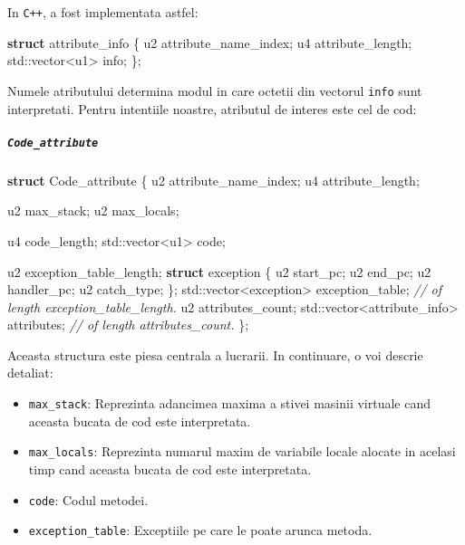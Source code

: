 \documentclass[]{article}
\newenvironment{Shaded}{}{}
\newcommand{\KeywordTok}[1]{\textcolor[rgb]{0.00,0.44,0.13}{\textbf{#1}}}
\newcommand{\DataTypeTok}[1]{\textcolor[rgb]{0.56,0.13,0.00}{#1}}
\newcommand{\CommentTok}[1]{\textcolor[rgb]{0.38,0.63,0.69}{\textit{#1}}}
\newcommand{\BuiltInTok}[1]{#1}
\newcommand{\NormalTok}[1]{#1}
\providecommand{\tightlist}{%
  \setlength{\itemsep}{0pt}\setlength{\parskip}{0pt}}
\let\oldsubparagraph\subparagraph
\renewcommand{\subparagraph}[1]{\oldsubparagraph{#1}\mbox{}}
\begin{document}
In \texttt{C++}, a fost implementata astfel:

\begin{Shaded}
	\begin{Highlighting}[]
		\KeywordTok{struct}\NormalTok{ attribute_info \{}
		\NormalTok{    u2 attribute_name_index;}
		\NormalTok{    u4 attribute_length;}
		\BuiltInTok{std::}\NormalTok{vector<u1> info;}
		\NormalTok{\};}
	\end{Highlighting}
\end{Shaded}

Numele atributului determina modul in care octetii din vectorul
\texttt{info} sunt interpretati. Pentru intentiile noastre, atributul de
interes este cel de cod:

\subparagraph{\texorpdfstring{\texttt{Code\_attribute}}{Code\_attribute}}\label{code_attribute}

\begin{Shaded}
	\begin{Highlighting}[]
		\KeywordTok{struct}\NormalTok{ Code_attribute \{}
		\NormalTok{    u2 attribute_name_index;}
		\NormalTok{    u4 attribute_length;}

		\NormalTok{    u2 max_stack;}
		\NormalTok{    u2 max_locals;}

		\NormalTok{    u4 code_length;}
		\BuiltInTok{std::}\NormalTok{vector<u1> code;}

		\NormalTok{    u2 exception_table_length;}
		\KeywordTok{struct}\NormalTok{ exception \{}
		\NormalTok{        u2 start_pc;}
		\NormalTok{        u2 end_pc;}
		\NormalTok{        u2 handler_pc;}
		\NormalTok{        u2 }\DataTypeTok{catch_type}\NormalTok{;}
		\NormalTok{    \};}
		\BuiltInTok{std::}\NormalTok{vector<exception> exception_table; }\CommentTok{// of length exception_table_length.}
		\NormalTok{    u2 attributes_count;}
		\BuiltInTok{std::}\NormalTok{vector<attribute_info> attributes; }\CommentTok{// of length attributes_count.}
		\NormalTok{\};}
	\end{Highlighting}
\end{Shaded}

Aceasta structura este piesa centrala a lucrarii. In continuare, o voi
descrie detaliat:

\begin{itemize}
	\tightlist
	\item
	      \texttt{max\_stack}: Reprezinta adancimea maxima a stivei masinii
	      virtuale cand aceasta bucata de cod este interpretata.
	\item
	      \texttt{max\_locals}: Reprezinta numarul maxim de variabile locale
	      alocate in acelasi timp cand aceasta bucata de cod este interpretata.
	\item
	      \texttt{code}: Codul metodei.
	\item
	      \texttt{exception\_table}: Exceptiile pe care le poate arunca metoda.
\end{itemize}
\end{document}
